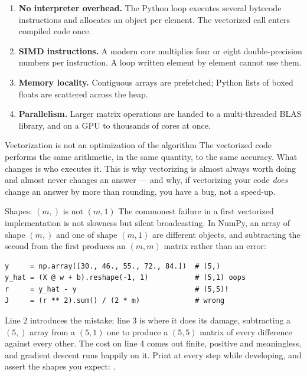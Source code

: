 \begin{enumerate}
  \item \textbf{No interpreter overhead.} The Python loop executes several
        bytecode instructions and allocates an object per element. The
        vectorized call enters compiled code once.
  \item \textbf{SIMD instructions.} A modern core multiplies four or eight
        double-precision numbers per instruction. A loop written element by
        element cannot use them.
  \item \textbf{Memory locality.} Contiguous arrays are prefetched; Python lists
        of boxed floats are scattered across the heap.
  \item \textbf{Parallelism.} Larger matrix operations are handed to a
        multi-threaded BLAS library, and on a GPU to thousands of cores at once.
\end{enumerate}

\begin{keyinsight}{Vectorization is not an optimization of the algorithm}
The vectorized code performs the same arithmetic, in the same quantity, to the
same accuracy. What changes is who executes it. This is why vectorizing is
almost always worth doing and almost never changes an answer --- and why, if
vectorizing your code \emph{does} change an answer by more than rounding, you
have a bug, not a speed-up.
\end{keyinsight}

\begin{pitfall}{Shapes: $(m,)$ is not $(m,1)$}
The commonest failure in a first vectorized implementation is not slowness but
silent broadcasting. In NumPy, an array of shape $(m,)$ and one of shape
$(m,1)$ are different objects, and subtracting the second from the first
produces an $(m,m)$ matrix rather than an error:

\begin{lstlisting}[style=pythonml]
y     = np.array([30., 46., 55., 72., 84.])  # (5,)
y_hat = (X @ w + b).reshape(-1, 1)           # (5,1) oops
r     = y_hat - y                            # (5,5)!
J     = (r ** 2).sum() / (2 * m)             # wrong
\end{lstlisting}

Line 2 introduces the mistake; line 3 is where it does its damage, subtracting
a $(5,)$ array from a $(5,1)$ one to produce a $(5,5)$ matrix of every
difference against every other. The cost on line 4 comes out finite, positive
and meaningless, and gradient descent runs happily on it. Print  at every step while developing, and assert
the shapes you expect:
.
\end{pitfall}


